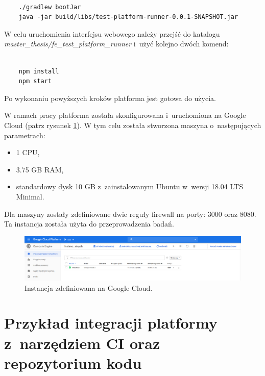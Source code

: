 {\selectfont
\tiny
\begin{lstlisting}

    ./gradlew bootJar
    java -jar build/libs/test-platform-runner-0.0.1-SNAPSHOT.jar

\end{lstlisting}
}

W celu uruchomienia interfejsu webowego należy przejść do katalogu \newline \textit{master\_thesis/fe\_test\_platform\_runner} i~użyć kolejno dwóch komend:

{\selectfont
\tiny
\begin{lstlisting}

    npm install
    npm start

\end{lstlisting}
}

Po wykonaniu powyższych kroków platforma jest gotowa do użycia.

W ramach pracy platforma została skonfigurowana i~uruchomiona na Google Cloud (patrz rysunek \ref{fig:google_cloud}).
W tym celu została stworzona maszyna o~następujących parametrach:
\begin{itemize}
    \item 1 CPU,
    \item 3.75 GB RAM,
    \item standardowy dysk 10 GB z~zainstalowanym Ubuntu w~wersji 18.04 LTS Minimal.
\end{itemize}
Dla maszyny zostały zdefiniowane dwie reguły firewall na porty: 3000 oraz 8080.
Ta instancja została użyta do przeprowadzenia badań.

\begin{figure}[h]
    \centering
    \includegraphics[width = 12cm]{chapter05/google_cloud.png}
    \caption{Instancja zdefiniowana na Google Cloud.}
    \label{fig:google_cloud}
\end{figure}

\section {Przykład integracji platformy z~narzędziem CI oraz repozytorium kodu}
\label{ci-integration}

